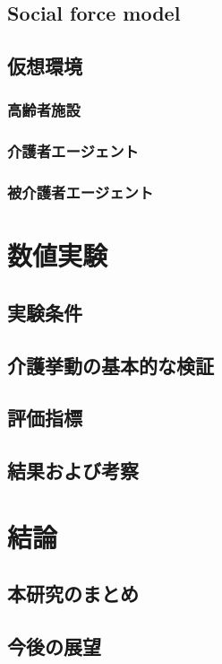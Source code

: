 \section{Social force model}

\section{仮想環境}

\subsection{高齢者施設}

\subsection{介護者エージェント}

\subsection{被介護者エージェント}

\chapter{数値実験}

\section{実験条件}

\section{介護挙動の基本的な検証}

\section{評価指標}

\section{結果および考察}

\chapter{結論}

\section{本研究のまとめ}

\section{今後の展望}
